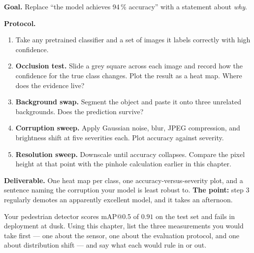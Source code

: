 \begin{practicallab}
\textbf{Goal.} Replace ``the model achieves 94\,\% accuracy'' with a statement
about \emph{why}.

\textbf{Protocol.}
\begin{enumerate}
  \item Take any pretrained classifier and a set of images it labels correctly
        with high confidence.
  \item \textbf{Occlusion test.} Slide a grey square across each image and
        record how the confidence for the true class changes. Plot the result
        as a heat map. Where does the evidence live?
  \item \textbf{Background swap.} Segment the object and paste it onto three
        unrelated backgrounds. Does the prediction survive?
  \item \textbf{Corruption sweep.} Apply Gaussian noise, blur, JPEG
        compression, and brightness shift at five severities each. Plot
        accuracy against severity.
  \item \textbf{Resolution sweep.} Downscale until accuracy collapses. Compare
        the pixel height at that point with the pinhole calculation earlier in
        this chapter.
\end{enumerate}

\textbf{Deliverable.} One heat map per class, one accuracy-versus-severity plot,
and a sentence naming the corruption your model is least robust to.
\textbf{The point:} step 3 regularly demotes an apparently excellent model, and
it takes an afternoon.
\end{practicallab}

\begin{checkpoint}
Your pedestrian detector scores mAP@0.5 of $0.91$ on the test set and fails in
deployment at dusk. Using this chapter, list the three measurements you would
take first --- one about the sensor, one about the evaluation protocol, and one
about distribution shift --- and say what each would rule in or out.
\end{checkpoint}

